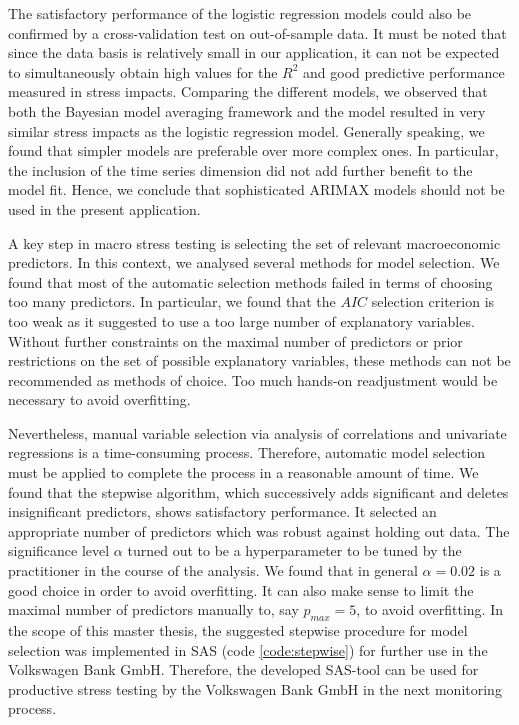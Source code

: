 \documentclass[a4paper, 11pt]{scrreprt}
\begin{document}
The satisfactory performance of the logistic regression models could also be confirmed by a cross-validation test on out-of-sample data.
It must be noted that since the data basis is relatively small in our application, it can not be expected to simultaneously obtain high values for the $R^2$ and good predictive performance measured in stress impacts.
Comparing the different models, we observed that both the Bayesian model averaging framework and the \textcite{wilson1997wilsonI} model resulted in very similar stress impacts as the logistic regression model.
Generally speaking, we found that simpler models are preferable over more complex ones. In particular, the inclusion of the time series dimension did not add further benefit to the model fit. Hence, we conclude that sophisticated ARIMAX models should not be used in the present application. 

A key step in macro stress testing is selecting the set of relevant macroeconomic predictors. In this context, we analysed several methods for model selection. We found that most of the automatic selection methods failed in terms of choosing too many predictors. In particular, we found that the $AIC$ selection criterion is too weak as it suggested to use a too large number of explanatory variables. Without further constraints on the maximal number of predictors or prior restrictions on the set of possible explanatory variables, these methods can not be recommended as methods of choice. Too much hands-on readjustment would be necessary to avoid overfitting. 

Nevertheless, manual variable selection via analysis of correlations and univariate regressions is a time-consuming process. Therefore, automatic model selection must be applied to complete the process in a reasonable amount of time.
We found that the stepwise algorithm, which successively adds significant and deletes insignificant predictors, shows satisfactory performance. It selected an appropriate number of predictors which was robust against holding out data. The significance level $\alpha$ turned out to be a hyperparameter to be tuned by the practitioner in the course of the analysis. We found that in general $\alpha = 0.02$ is a good choice in order to avoid overfitting.
It can also make sense to limit the maximal number of predictors manually to, say $p_{max} = 5$, to avoid overfitting. In the scope of this master thesis, the suggested stepwise procedure for model selection was implemented in SAS (code \ref{code:stepwise}) for further use in the Volkswagen Bank GmbH. Therefore, the developed SAS-tool can be used for productive stress testing by the Volkswagen Bank GmbH in the next monitoring process.
\end{document}
